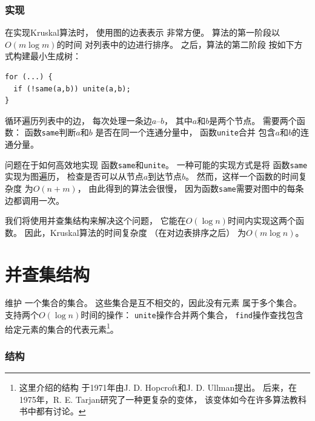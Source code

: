 \subsubsection{实现}

在实现Kruskal算法时，
使用图的边表表示
非常方便。
算法的第一阶段以$O(m \log m)$的时间
对列表中的边进行排序。
之后，算法的第二阶段
按如下方式构建最小生成树：

\begin{lstlisting}
for (...) {
  if (!same(a,b)) unite(a,b);
}
\end{lstlisting}

循环遍历列表中的边，
每次处理一条边$a$--$b$，
其中$a$和$b$是两个节点。
需要两个函数：
函数\texttt{same}判断$a$和$b$
是否在同一个连通分量中，
函数\texttt{unite}合并
包含$a$和$b$的连通分量。

问题在于如何高效地实现
函数\texttt{same}和\texttt{unite}。
一种可能的实现方式是将
函数\texttt{same}实现为图遍历，
检查是否可以从节点$a$到达节点$b$。
然而，这样一个函数的时间复杂度
为$O(n+m)$，
由此得到的算法会很慢，
因为函数\texttt{same}需要对图中的每条边都调用一次。

我们将使用并查集结构来解决这个问题，
它能在$O(\log n)$时间内实现这两个函数。
因此，Kruskal算法的时间复杂度
（在对边表排序之后）
为$O(m \log n)$。

\section{并查集结构}


维护
一个集合的集合。
这些集合是互不相交的，因此没有元素
属于多个集合。
支持两个$O(\log n)$时间的操作：
\texttt{unite}操作合并两个集合，
\texttt{find}操作查找包含给定元素的集合的代表元素\footnote{这里介绍的结构
于1971年由J. D. Hopcroft和J. D. Ullman提出\cite{hop71}。
后来，在1975年，R. E. Tarjan研究了一种更复杂的变体\cite{tar75}，
该变体如今在许多算法教科书中都有讨论。}。

\subsubsection{结构}

